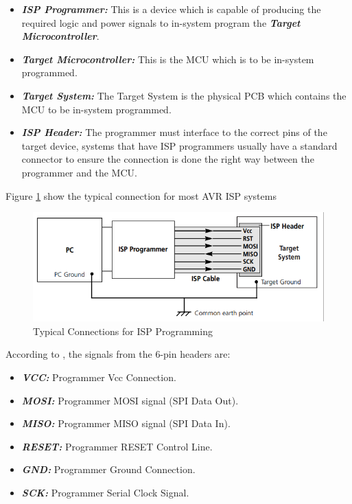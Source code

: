 	\begin{itemize}
		\item\textit{\textbf{ISP Programmer: }} This is a device which is capable of producing the required logic and power signals to in-system program the \textbf{\textit{Target Microcontroller}}.\label{itm:isp-programmer}
		\item\textit{\textbf{Target Microcontroller: }} This is the MCU which is to be in-system programmed.\label{itm:isp-target-mcu}
		\item\textit{\textbf{Target System: }} The Target System is the physical PCB which contains the MCU to be in-system programmed.\label{itm:isp-target-system}
		\item\textit{\textbf{ISP Header: }} The programmer must interface to the correct pins of the target device, systems that have ISP programmers usually have a standard connector to ensure the connection is done the right way between the programmer and the MCU.\label{itm:isp-header}
	\end{itemize}

	Figure \ref{fig:typical-connections-for-isp-programming} show the typical connection for most AVR ISP systems

		\begin{figure}[htbp]
			\centering
			\includegraphics[scale=0.7]{figuras/fig-typical-connections-for-isp-programming.png}
			\caption{Typical Connections for ISP Programming \cite{typical-connections-for-isp-programming}}
			\label{fig:typical-connections-for-isp-programming}
		\end{figure}


	According to \cite{equinox-isp}, the signals from the 6-pin headers are:

	\begin{itemize}
		\item\textit{\textbf{VCC: }} Programmer Vcc Connection.\label{item:isp-vcc}
		\item\textit{\textbf{MOSI: }} Programmer MOSI signal (SPI Data Out).\label{item:isp-mosi}
		\item\textit{\textbf{MISO: }} Programmer MISO signal (SPI Data In).\label{item:isp-miso}
		\item\textit{\textbf{RESET: }} Programmer RESET Control Line.\label{item:isp-reset}
		\item\textit{\textbf{GND: }} Programmer Ground Connection.\label{item:isp-gnd}
		\item\textit{\textbf{SCK: }} Programmer Serial Clock Signal.\label{item:isp-sck}
	\end{itemize}
